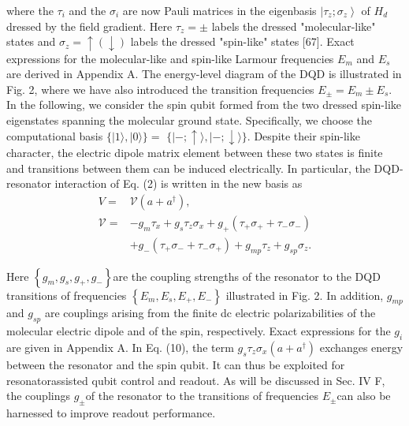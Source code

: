 \documentclass[12pt]{article}
\begin{document}
where the $\tau_i$ and the $\sigma_i$ are now Pauli matrices in the eigenbasis $\left|\tau_z ; \sigma_z\right\rangle$ of $H_d$ dressed by the field gradient. 
Here $\tau_z= \pm$ labels the dressed "molecular-like" states and $\sigma_z=\uparrow(\downarrow)$ labels the dressed "spin-like" states [67]. 
Exact expressions for the molecular-like and spin-like Larmour frequencies $E_m$ and $E_s$ are derived in Appendix A. The energy-level diagram of the DQD is illustrated in Fig. 2, where we have also introduced the transition frequencies $E_{ \pm}=E_m \pm E_s$. 
In the following, we consider the spin qubit formed from the two dressed spin-like eigenstates spanning the molecular ground state. 
Specifically, we choose the computational basis $\{|1\rangle,|0\rangle\}=$ $\{|-; \uparrow\rangle,|-; \downarrow\rangle\}$. 
Despite their spin-like character, the electric dipole matrix element between these two states is finite and transitions between them can be induced electrically. 
In particular, the DQD-resonator interaction of Eq. (2) is written in the new basis as
\begin{equation}\label{eq:DQD_resonator_interaction_new_basis}
    \begin{aligned}
        V= & \mathcal{V}\left(a+a^{\dagger}\right), \\
        \mathcal{V}= & -g_m \tau_x+g_s \tau_z \sigma_x+g_{+}\left(\tau_{+} \sigma_{+}+\tau_{-} \sigma_{-}\right) \\
        & +g_{-}\left(\tau_{+} \sigma_{-}+\tau_{-} \sigma_{+}\right)+g_{m p} \tau_z+g_{s p} \sigma_z .
        \end{aligned}    
\end{equation}

Here $\left\{g_m, g_s, g_{+}, g_{-}\right\}$are the coupling strengths of the resonator to the DQD transitions of frequencies $\left\{E_m, E_s, E_{+}, E_{-}\right\}$ illustrated in Fig. 2. 
In addition, $g_{m p}$ and $g_{s p}$ are couplings arising from the finite dc electric polarizabilities of the molecular electric dipole and of the spin, respectively. 
Exact expressions for the $g_i$ are given in Appendix A. In Eq. (10), the term $g_s \tau_z \sigma_x\left(a+a^{\dagger}\right)$ exchanges energy between the resonator and the spin qubit. It can thus be exploited for resonatorassisted qubit control and readout. 
As will be discussed in Sec. IV F, the couplings $g_{ \pm}$of the resonator to the transitions of frequencies $E_{ \pm}$can also be harnessed to improve readout performance.
\end{document}
